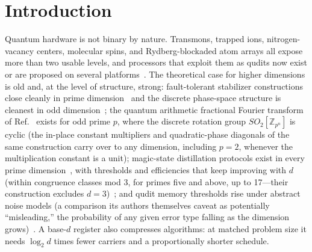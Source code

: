 \documentclass[aps,pra,reprint,superscriptaddress,nofootinbib,floatfix]{revtex4-2}
\begin{document}
\section{Introduction}
\label{sec:intro}

Quantum hardware is not binary by nature. Transmons, trapped ions,
nitrogen-vacancy centers, molecular spins, and Rydberg-blockaded atom
arrays all expose more than two
usable levels, and processors that exploit them as qudits now exist
or are proposed on several
platforms~\cite{ringbauer2022,blok2021,goss2022,low2023,gardill2020,chiesa2024,robert2026}.
The theoretical case for higher dimensions is old and, at the level of
structure, strong: fault-tolerant stabilizer constructions close cleanly
in prime dimension~\cite{gottesman1999} and the discrete phase-space
structure is cleanest in odd dimension~\cite{gross2006}; the quantum
arithmetic fractional Fourier transform of Ref.~\cite{floratos2024}
exists for odd prime $p$, where the discrete rotation group
$SO_2[\mathbb{Z}_{p^n}]$ is cyclic (the in-place constant multipliers
and quadratic-phase diagonals of the same construction carry over to
any dimension, including $p=2$, whenever the multiplication constant
is a unit);
magic-state distillation protocols exist in every prime
dimension~\cite{campbell2012}, with thresholds and efficiencies that
keep improving with $d$ (within congruence classes mod 3, for primes
five and above, up to 17---their construction excludes
$d=3$)~\cite{campbell2014}; and qudit memory thresholds rise under
abstract noise models (a comparison its authors themselves caveat as
potentially ``misleading,'' the probability of any given error type
falling as the dimension grows)~\cite{marks2017}. A base-$d$ register also compresses algorithms:
at matched problem size it needs $\log_2 d$ times fewer carriers and a
proportionally shorter schedule.
\end{document}
